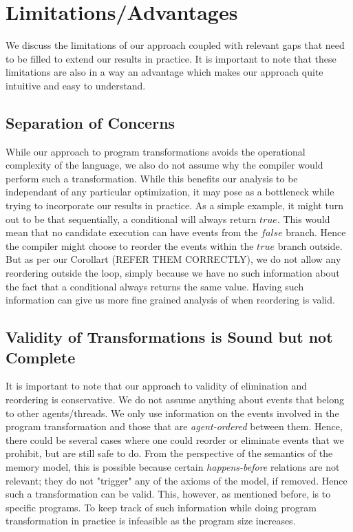 \section{Limitations/Advantages}

    We discuss the limitations of our approach coupled with relevant gaps that need to be filled to extend our results in practice. 
    It is important to note that these limitations are also in a way an advantage which makes our approach quite intuitive and easy to understand. 

    \subsection{Separation of Concerns}

    While our approach to program transformations avoids the operational complexity of the language, we also do not assume why the compiler would perform such a transformation.
    While this benefits our analysis to be independant of any particular optimization, it may pose as a bottleneck while trying to incorporate our results in practice. 
    As a simple example, it might turn out to be that sequentially, a conditional will always return $true$. This would mean that no candidate execution can have events from the $false$ branch. Hence the compiler might choose to reorder the events within the $true$ branch outside. 
    But as per our Corollart (REFER THEM CORRECTLY), we do not allow any reordering outside the loop, simply because we have no such information about the fact that a conditional always returns the same value. 
    Having such information can give us more fine grained analysis of when reordering is valid. 

    \subsection{Validity of Transformations is Sound but not Complete}

    It is important to note that our approach to validity of elimination and reordering is conservative.
    We do not assume anything about events that belong to other agents/threads. 
    We only use information on the events involved in the program transformation and those that are \textit{agent-ordered} between them.
    Hence, there could be several cases where one could reorder or eliminate events that we prohibit, but are still safe to do. 
    From the perspective of the semantics of the memory model, this is possible because certain \textit{happens-before} relations are not relevant; they do not "trigger" any of the axioms of the model, if removed. 
    Hence such a transformation can be valid. 
    This, however, as mentioned before, is to specific programs. To keep track of such information while doing program transformation in practice is infeasible as the program size increases.
    
